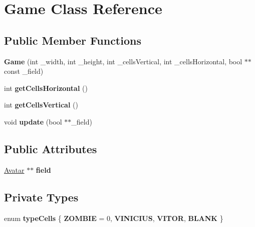 \hypertarget{classGame}{}\section{Game Class Reference}
\label{classGame}
\subsection*{Public Member Functions}
\begin{DoxyCompactItemize}
\item 
{\bfseries Game} (int \+\_\+width, int \+\_\+height, int \+\_\+cells\+Vertical, int \+\_\+cells\+Horizontal, bool $\ast$$\ast$const \+\_\+field)\hypertarget{classGame_a878e46dca3d4a4b7c5be94d03e376569}{}\label{classGame_a878e46dca3d4a4b7c5be94d03e376569}

\item 
int {\bfseries get\+Cells\+Horizontal} ()\hypertarget{classGame_ab191e9914c3b3b30162fb49b02d0bd36}{}\label{classGame_ab191e9914c3b3b30162fb49b02d0bd36}

\item 
int {\bfseries get\+Cells\+Vertical} ()\hypertarget{classGame_a6ddb90d54f45464e9a80a9ab6501ccb1}{}\label{classGame_a6ddb90d54f45464e9a80a9ab6501ccb1}

\item 
void {\bfseries update} (bool $\ast$$\ast$\+\_\+field)\hypertarget{classGame_af6fd557aa9a11e04b8d94b6c35996a60}{}\label{classGame_af6fd557aa9a11e04b8d94b6c35996a60}

\end{DoxyCompactItemize}
\subsection*{Public Attributes}
\begin{DoxyCompactItemize}
\item 
\hyperlink{classAvatar}{Avatar} $\ast$$\ast$ {\bfseries field}\hypertarget{classGame_a0397b9eb4da1907b4de83b7e450fe1ea}{}\label{classGame_a0397b9eb4da1907b4de83b7e450fe1ea}

\end{DoxyCompactItemize}
\subsection*{Private Types}
\begin{DoxyCompactItemize}
\item 
enum {\bfseries type\+Cells} \{ {\bfseries Z\+O\+M\+B\+IE} = 0, 
{\bfseries V\+I\+N\+I\+C\+I\+US}, 
{\bfseries V\+I\+T\+OR}, 
{\bfseries B\+L\+A\+NK}
 \}\hypertarget{classGame_a15939429a3b6e3f068272c60a885e809}{}\label{classGame_a15939429a3b6e3f068272c60a885e809}

\end{DoxyCompactItemize}
